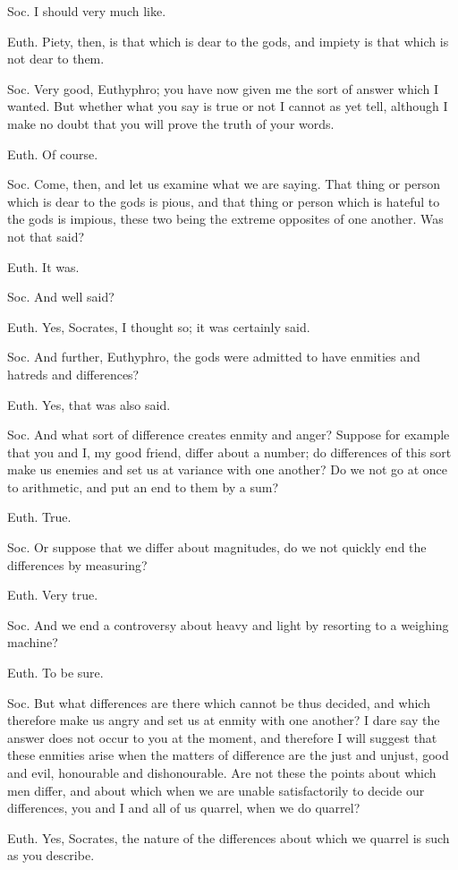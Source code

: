 Soc. I should very much like.

Euth. Piety, then, is that which is dear to the gods, and impiety is that which is not dear to them.

Soc. Very good, Euthyphro; you have now given me the sort of answer which I wanted. But whether what you say is true or not I cannot as yet tell, although I make no doubt that you will prove the truth of your words.

Euth. Of course.

Soc. Come, then, and let us examine what we are saying. That thing or person which is dear to the gods is pious, and that thing or person which is hateful to the gods is impious, these two being the extreme opposites of one another. Was not that said?

Euth. It was.

Soc. And well said?

Euth. Yes, Socrates, I thought so; it was certainly said.

Soc. And further, Euthyphro, the gods were admitted to have enmities and hatreds and differences?

Euth. Yes, that was also said.

Soc. And what sort of difference creates enmity and anger? Suppose for example that you and I, my good friend, differ about a number; do differences of this sort make us enemies and set us at variance with one another? Do we not go at once to arithmetic, and put an end to them by a sum?

Euth. True.

Soc. Or suppose that we differ about magnitudes, do we not quickly end the differences by measuring?

Euth. Very true.

Soc. And we end a controversy about heavy and light by resorting to a weighing machine?

Euth. To be sure.

Soc. But what differences are there which cannot be thus decided, and which therefore make us angry and set us at enmity with one another? I dare say the answer does not occur to you at the moment, and therefore I will suggest that these enmities arise when the matters of difference are the just and unjust, good and evil, honourable and dishonourable. Are not these the points about which men differ, and about which when we are unable satisfactorily to decide our differences, you and I and all of us quarrel, when we do quarrel?

Euth. Yes, Socrates, the nature of the differences about which we quarrel is such as you describe.

